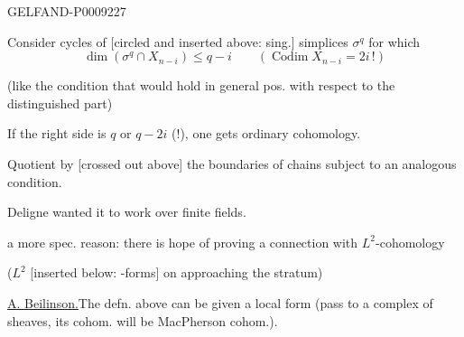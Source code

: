 \begin{GelfandAdjacentEvidence}{GELFAND-P000922}{7}


Consider cycles of [circled and inserted above: sing.] simplices $\sigma^q$ for which
\begin{equation*}
 \dim(\sigma^q\cap X_{n-i})\leq q-i
 \qquad (\operatorname{Codim}X_{n-i}=2i\,!)
 \tag{3}
\end{equation*}

(like the condition that would hold in general pos. with respect to the distinguished part)

If the right side is $q$ or $q-2i$ (!), one gets ordinary cohomology.

Quotient by [crossed out above] the boundaries of chains subject to an analogous condition.
\end{GelfandAdjacentEvidence}



Deligne wanted it to work over finite fields.

a more spec. reason: there is hope of proving a connection with $L^2$-cohomology

($L^2$ [inserted below: -forms] on approaching the stratum)

\underline{A. Beilinson.}\quad The defn. above can be given a local form (pass to a complex of sheaves, its cohom. will be MacPherson cohom.).


